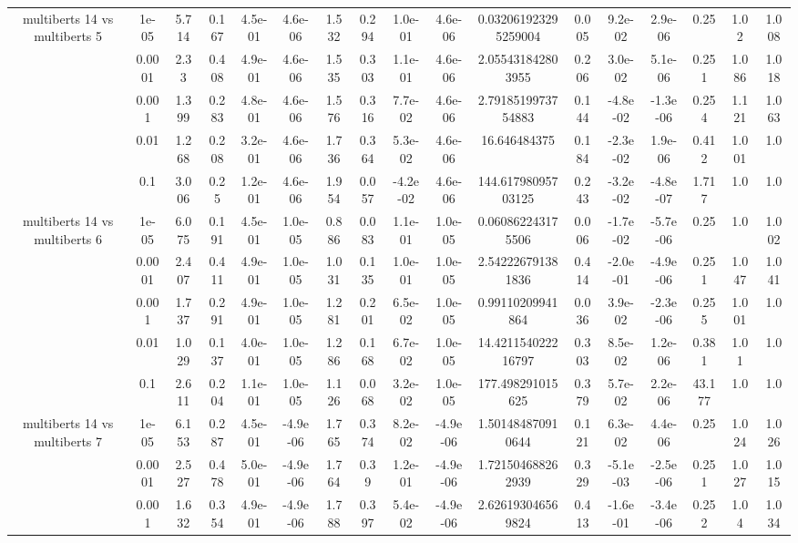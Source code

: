 \begin{tabular}{|c|c|c|c|c|c|c|c|c|c|c|c|c|c|c|c|c|}
\hline
\multirow{5}{*}{multiberts 14 vs multiberts 5} & 1e-05 & 5.714 & 0.167 & 4.5e-01 & 4.6e-06 & 1.532 & 0.294 & 1.0e-01 & 4.6e-06 & 0.032061923295259004 & 0.005 & 9.2e-02 & 2.9e-06 & 0.25 & 1.02 & 1.008 \\
 & 0.0001 & 2.33 & 0.408 & 4.9e-01 & 4.6e-06 & 1.535 & 0.303 & 1.1e-01 & 4.6e-06 & 2.055431842803955 & 0.206 & 3.0e-02 & 5.1e-06 & 0.251 & 1.086 & 1.018 \\
 & 0.001 & 1.399 & 0.283 & 4.8e-01 & 4.6e-06 & 1.576 & 0.316 & 7.7e-02 & 4.6e-06 & 2.7918519973754883 & 0.144 & -4.8e-02 & -1.3e-06 & 0.254 & 1.121 & 1.063 \\
 & 0.01 & 1.268 & 0.208 & 3.2e-01 & 4.6e-06 & 1.736 & 0.364 & 5.3e-02 & 4.6e-06 & 16.646484375 & 0.184 & -2.3e-02 & 1.9e-06 & 0.412 & 1.001 & 1.0 \\
 & 0.1 & 3.006 & 0.25 & 1.2e-01 & 4.6e-06 & 1.954 & 0.057 & -4.2e-02 & 4.6e-06 & 144.61798095703125 & 0.243 & -3.2e-02 & -4.8e-07 & 1.717 & 1.0 & 1.0 \\
\hline
\multirow{5}{*}{multiberts 14 vs multiberts 6} & 1e-05 & 6.075 & 0.191 & 4.5e-01 & 1.0e-05 & 0.886 & 0.083 & 1.1e-01 & 1.0e-05 & 0.060862243175506 & 0.006 & -1.7e-02 & -5.7e-06 & 0.25 & 1.0 & 1.002 \\
 & 0.0001 & 2.407 & 0.411 & 4.9e-01 & 1.0e-05 & 1.031 & 0.135 & 1.0e-01 & 1.0e-05 & 2.542226791381836 & 0.414 & -2.0e-01 & -4.9e-06 & 0.251 & 1.047 & 1.041 \\
 & 0.001 & 1.737 & 0.291 & 4.9e-01 & 1.0e-05 & 1.281 & 0.201 & 6.5e-02 & 1.0e-05 & 0.99110209941864 & 0.036 & 3.9e-02 & -2.3e-06 & 0.255 & 1.001 & 1.0 \\
 & 0.01 & 1.029 & 0.137 & 4.0e-01 & 1.0e-05 & 1.286 & 0.168 & 6.7e-02 & 1.0e-05 & 14.421154022216797 & 0.303 & 8.5e-02 & 1.2e-06 & 0.381 & 1.01 & 1.0 \\
 & 0.1 & 2.611 & 0.204 & 1.1e-01 & 1.0e-05 & 1.126 & 0.068 & 3.2e-02 & 1.0e-05 & 177.498291015625 & 0.379 & 5.7e-02 & 2.2e-06 & 43.177 & 1.0 & 1.0 \\
\hline
\multirow{5}{*}{multiberts 14 vs multiberts 7} & 1e-05 & 6.153 & 0.287 & 4.5e-01 & -4.9e-06 & 1.765 & 0.374 & 8.2e-02 & -4.9e-06 & 1.501484870910644 & 0.121 & 6.3e-02 & 4.4e-06 & 0.25 & 1.024 & 1.026 \\
 & 0.0001 & 2.527 & 0.478 & 5.0e-01 & -4.9e-06 & 1.764 & 0.39 & 1.2e-01 & -4.9e-06 & 1.721504688262939 & 0.329 & -5.1e-03 & -2.5e-06 & 0.251 & 1.027 & 1.015 \\
 & 0.001 & 1.632 & 0.354 & 4.9e-01 & -4.9e-06 & 1.788 & 0.397 & 5.4e-02 & -4.9e-06 & 2.626193046569824 & 0.413 & -1.6e-01 & -3.4e-06 & 0.252 & 1.04 & 1.034 \\

\end{tabular}

